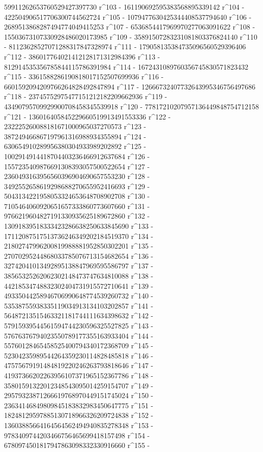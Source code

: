        59911262653760529427397730 r^103 - 
       161190692595383568895339142 r^104 - 
       422504906517706300744562724 r^105 - 
       1079477630425344408537794640 r^106 - 
       2689513868287494774049415253 r^107 - 
       6536854417969970277063091622 r^108 - 
       15503673107330928486020173985 r^109 - 
       35891507283231081803376824140 r^110 - 
       81123628527071288317847328974 r^111 - 
       179058135384735096560529396406 r^112 - 
       386017764021412128171312984396 r^113 - 
       812914535356785844115786391984 r^114 - 
       1672431089760356745830571823432 r^115 - 
       3361588286190818017152507699936 r^116 - 
       6601592094209766264828492847894 r^117 - 
       12666732407732643995346756497686 r^118 - 
       23745752975477151212182209662936 r^119 - 
       43490795709929900708458345539918 r^120 - 
       77817210207957136449848754712158 r^121 - 
       136016405845229660519913491553336 r^122 - 
       232225260088181671000965037270573 r^123 - 
       387249466867197961316988934355894 r^124 - 
       630654910289956380304933989202892 r^125 - 
       1002914914418704403236466912637684 r^126 - 
       1557235409876691308393057500522654 r^127 - 
       2360493163956560396904690657553230 r^128 - 
       3492552658619298688270655952416693 r^129 - 
       5043134221958053324653648708902708 r^130 - 
       7105464060920651657333860773607660 r^131 - 
       9766219604827191330935625189672860 r^132 - 
       13091839518333423286638250633845690 r^133 - 
       17112087517513736246349202184519370 r^134 - 
       21802747996200819988881952850302201 r^135 - 
       27070295244868033785076713154682654 r^136 - 
       32742041013492895138847969595586797 r^137 - 
       38565325262062302148473747634810088 r^138 - 
       44218534748832302404731915572710641 r^139 - 
       49335044258946706990648774539260732 r^140 - 
       53538755938335119034913134103202857 r^141 - 
       56487213515463321181744111634398632 r^142 - 
       57915939544561594744230596325527825 r^143 - 
       57676376794023550789177355163933404 r^144 - 
       55760128465458525400794340172368709 r^145 - 
       52304235989544264359230114828485818 r^146 - 
       47575679191484819220246263793818646 r^147 - 
       41937366202263956107371965152367786 r^148 - 
       35801591322012348543095014259154707 r^149 - 
       29579323871266619768970449151745024 r^150 - 
       23634146849809845183832983450647775 r^151 - 
       18248129597885130718966326209724838 r^152 - 
       13603885664164564562494940835278348 r^153 - 
       9783409744203466756465699418157498 r^154 - 
       6780974501817947863098332330916660 r^155 - 
